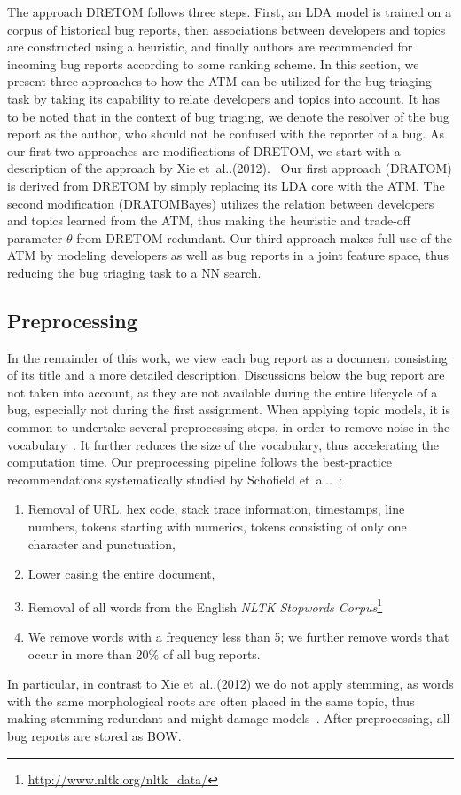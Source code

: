 \documentclass[a4paper,twoside]{article}
\makeatletter
\DeclareRobustCommand\onedot{\futurelet\@let@token\@onedot}
\def\@onedot{\ifx\@let@token.\else.\null\fi\xspace}
\def\etal{et~al\onedot}
\makeatother
\begin{document}
The approach \ac{DRETOM} follows three steps.
First, an \ac{LDA} model is trained on a corpus of historical bug reports, then associations between developers and topics are constructed using a heuristic, and finally authors are recommended for incoming bug reports according to some ranking scheme.
In this section, we present three approaches to how the \ac{ATM} can be utilized for the bug triaging task by taking its capability to relate developers and topics into account.
It has to be noted that in the context of bug triaging, we denote the resolver of the bug report as the author, who should not be confused with the reporter of a bug.
As our first two approaches are modifications of \ac{DRETOM}, we start with a description of the approach by Xie \etal (2012).~\nocite{xie2012dretom}
Our first approach (\ac{DRATOM}) is derived from \ac{DRETOM} by simply replacing its \ac{LDA} core with the \ac{ATM}.
The second modification (\ac{DRATOMBayes}) utilizes the relation between developers and topics learned from the \ac{ATM}, thus making the heuristic and trade-off parameter $\theta$ from \ac{DRETOM} redundant.
Our third approach makes full use of the \ac{ATM} by modeling developers as well as bug reports in a joint feature space, thus reducing the bug triaging task to a \ac{NN} search.

\subsection{Preprocessing}
\label{ssec: preprocessing}
In the remainder of this work, we view each bug report as a document consisting of its title and a more detailed description.
Discussions below the bug report are not taken into account, as they are not available during the entire lifecycle of a bug, especially not during the first assignment.
When applying topic models, it is common to undertake several preprocessing steps, in order to remove noise in the vocabulary~\cite{chen2016survey}.
It further reduces the size of the vocabulary, thus accelerating the computation time.
Our preprocessing pipeline follows the best-practice recommendations systematically studied by Schofield \etal~\cite{Schofield2017UnderstandingAllocation,Schofield2017PullingModels,Schofield2017QuantifyingModels}:
\begin{enumerate}
    \item Removal of URL, hex code, stack trace information, timestamps, line numbers, tokens starting with numerics, tokens consisting of only one character and punctuation,
    \item Lower casing the entire document,
    \item Removal of all words from the English \textit{NLTK Stopwords Corpus}\footnote{\url{http://www.nltk.org/nltk\_data/}}
    \item We remove words with a frequency less than 5; we further remove words that occur in more than 20\% of all bug reports.
\end{enumerate}
In particular, in contrast to Xie \etal (2012) we do not apply stemming, as words with the same morphological roots are often placed in the same topic, thus making stemming redundant and might damage models~\cite{Schofield2016ComparingModels}.
After preprocessing, all bug reports are stored as \ac{BOW}.
\end{document}
